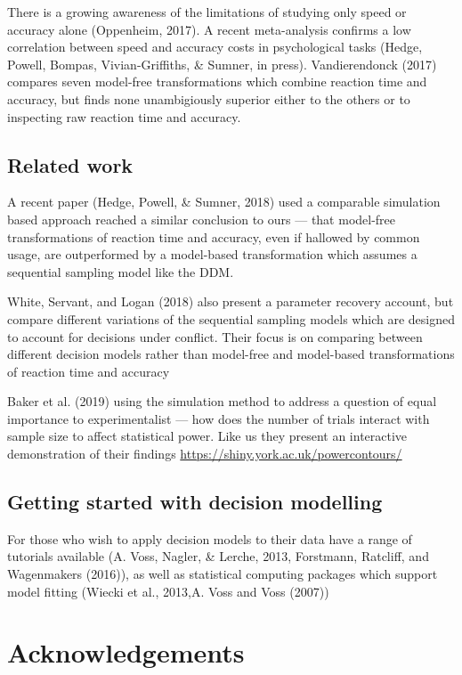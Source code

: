 \documentclass[floatsintext,doc]{apa6}
\theoremstyle{definition}
\theoremstyle{definition}
\theoremstyle{definition}
\theoremstyle{remark}
\begin{document}
There is a growing awareness of the limitations of studying only speed
or accuracy alone (Oppenheim, 2017). A recent meta-analysis confirms a
low correlation between speed and accuracy costs in psychological tasks
(Hedge, Powell, Bompas, Vivian-Griffiths, \& Sumner, in press).
Vandierendonck (2017) compares seven model-free transformations which
combine reaction time and accuracy, but finds none unambigiously
superior either to the others or to inspecting raw reaction time and
accuracy.

\subsection{Related work}\label{related-work}

A recent paper (Hedge, Powell, \& Sumner, 2018) used a comparable
simulation based approach reached a similar conclusion to ours --- that
model-free transformations of reaction time and accuracy, even if
hallowed by common usage, are outperformed by a model-based
transformation which assumes a sequential sampling model like the DDM.

White, Servant, and Logan (2018) also present a parameter recovery
account, but compare different variations of the sequential sampling
models which are designed to account for decisions under conflict. Their
focus is on comparing between different decision models rather than
model-free and model-based transformations of reaction time and accuracy

Baker et al. (2019) using the simulation method to address a question of
equal importance to experimentalist --- how does the number of trials
interact with sample size to affect statistical power. Like us they
present an interactive demonstration of their findings
\url{https://shiny.york.ac.uk/powercontours/}

\subsection{Getting started with decision
modelling}\label{getting-started-with-decision-modelling}

For those who wish to apply decision models to their data have a range
of tutorials available (A. Voss, Nagler, \& Lerche, 2013, Forstmann,
Ratcliff, and Wagenmakers (2016)), as well as statistical computing
packages which support model fitting (Wiecki et al., 2013,A. Voss and
Voss (2007))

\section{Acknowledgements}\label{acknowledgements}
\end{document}
